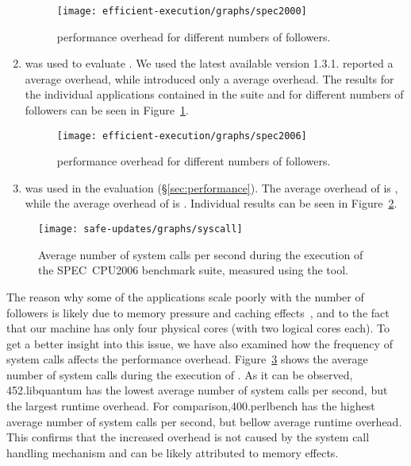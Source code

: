 \begin{enumerate}
\begin{figure}[!t]
  \centering
  \texttt{[image: efficient-execution/graphs/spec2000]}
  \caption{\speczerozero performance overhead for different numbers of followers.}
  \label{fig:spec2000}
\end{figure}

\item[\speczerozero\footnote{\url{http://www.spec.org/cpu2000/}}]
was used to evaluate \orchestra.  We used the latest available version 1.3.1.
\orchestra reported a \orchestraSpec average overhead, while \varan introduced
only a \speczerozeroOneFollower average overhead. The results for the
individual applications contained in the \speczerozero suite and for different
numbers of followers can be seen in Figure~\ref{fig:spec2000}.

\begin{figure}[!t]
  \centering
  \texttt{[image: efficient-execution/graphs/spec2006]}
  \caption{\speczerosix performance overhead for different numbers of followers.}
  \label{fig:spec2006}
\end{figure}

\item[\speczerosix\footnote{\url{http://www.spec.org/cpu2006/}}]
was used in the \mx evaluation (\S\ref{sec:performance}). The average overhead
of \mx is \mxSpec, while the average overhead of \varan is
\speczerosixOneFollower.  Individual results can be seen in
Figure~\ref{fig:spec2006}.

\end{enumerate}

\begin{figure}[ht]
\begin{center}
\texttt{[image: safe-updates/graphs/syscall]}
\caption{Average number of system calls per second during the execution of the
SPEC~CPU2006 benchmark suite, measured using the \strace tool.}
\label{fig:syscall}
\end{center}
\end{figure}

The reason why some of the \speccpu applications scale poorly with the number
of followers is likely due to memory pressure and caching
effects~\cite{jaleel07}, and to the fact that our machine has only four
physical cores (with two logical cores each). To get a better insight into this
issue, we have also examined how the frequency of system calls affects the
performance overhead. Figure~\ref{fig:syscall} shows the average number of
system calls during the execution of \speczerosix. As it can be observed,
\textsf{452.libquantum} has the lowest average number of system calls per
second, but the largest runtime overhead. For comparison,\textsf{400.perlbench}
has the highest average number of system calls per second, but bellow average
runtime overhead. This confirms that the increased overhead is not caused by
the system call handling mechanism and can be likely attributed to memory
effects.

